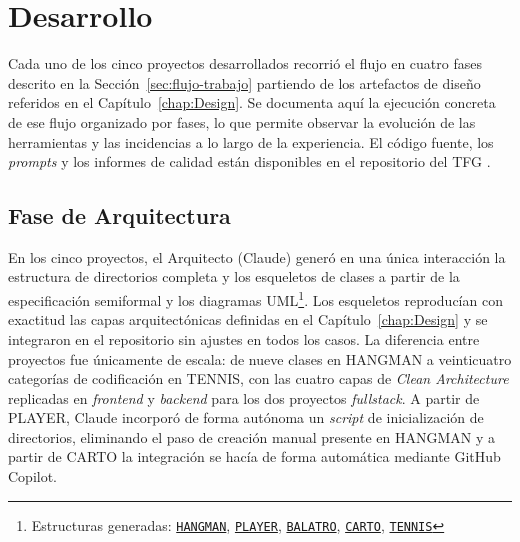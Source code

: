 
\chapter{Desarrollo} \label{chap:Development}

Cada uno de los cinco proyectos desarrollados recorrió el flujo en cuatro fases descrito en la Sección~\ref{sec:flujo-trabajo} partiendo de los artefactos de diseño referidos en el Capítulo~\ref{chap:Design}. 
Se documenta aquí la ejecución concreta de ese flujo organizado por fases, lo que permite observar la evolución de las herramientas y las incidencias a lo largo de la experiencia. 
El código fuente, los \textit{prompts} y los informes de calidad están disponibles en el repositorio del \ac{TFG} \cite{URL::TFG}.

\section{Fase de Arquitectura} \label{sec:dev-architecture}

En los cinco proyectos, el Arquitecto (Claude) generó en una única interacción la estructura de directorios completa y los esqueletos de clases a partir de la especificación semiformal y los diagramas UML\footnote{Estructuras generadas: \href{https://github.com/alu0101549491/TFG-Fabian-Gonzalez-Lence/blob/main/resources/project-structures/1-TheHangmanGame.md}{\texttt{HANGMAN}}, \href{https://github.com/alu0101549491/TFG-Fabian-Gonzalez-Lence/blob/main/resources/project-structures/2-MusicWebPlayer.md}{\texttt{PLAYER}}, \href{https://github.com/alu0101549491/TFG-Fabian-Gonzalez-Lence/blob/main/resources/project-structures/3-MiniBalatro.md}{\texttt{BALATRO}}, \href{https://github.com/alu0101549491/TFG-Fabian-Gonzalez-Lence/blob/main/resources/project-structures/4-CartographicProjectManager.md}{\texttt{CARTO}}, \href{https://github.com/alu0101549491/TFG-Fabian-Gonzalez-Lence/blob/main/resources/project-structures/5-TennisTournamentManager.md}{\texttt{TENNIS}}}. Los esqueletos reproducían con exactitud las capas arquitectónicas definidas en el Capítulo~\ref{chap:Design} y se integraron en el repositorio sin ajustes en todos los casos. La diferencia entre proyectos fue únicamente de escala: de nueve clases en \ac{HANGMAN} a veinticuatro categorías de codificación en \ac{TENNIS}, con las cuatro capas de \textit{Clean Architecture} replicadas en \textit{frontend} y \textit{backend} para los dos proyectos \textit{fullstack}. A partir de \ac{PLAYER}, Claude incorporó de forma autónoma un \textit{script} de inicialización de directorios, eliminando el paso de creación manual presente en \ac{HANGMAN} y a partir de \ac{CARTO} la integración se hacía de forma automática mediante GitHub Copilot.

